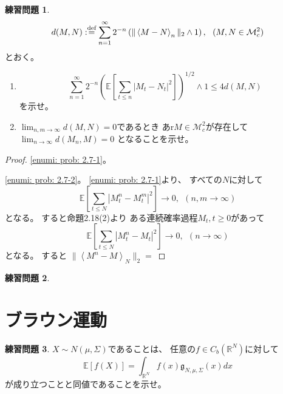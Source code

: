 \documentclass[uplatex]{jsarticle}
\theoremstyle{definition}
\newtheorem{prob}[prob]{練習問題}
\def\R{\mathbb{R}}
\def\E{\mathbb{E}}
\def\mcM{\mathcal{M}}
\def\dfn{:\overset{\mbox{{\scriptsize def}}}{=}}
\begin{document}
\begin{prob}\label{prob: 2.7}
  \[
  d(M,N) \dfn \sum_{n=1}^\infty 2^{-n}
  \left( \| \left< M-N\right>_n \|_2 \wedge 1 \right) ,
  \ \ (M,N\in \mcM_c^2)
  \]
  とおく。
  \begin{enumerate}
    \item \label{enumi: prob: 2.7-1}
    \[
    \sum_{n=1}^\infty 2^{-n}\left(
    \E \left[ \sum_{t\leq n}|M_t-N_t|^2\right]\right)^{1/2}\wedge 1
    \leq 4d(M,N)
    \]
    を示せ。
    \item \label{enumi: prob: 2.7-2}
    \(\lim_{n,m\to \infty}d(M,N)=0\)であるとき
    あr\(M\in \mcM_c^2\)が存在して\(\lim_{n\to \infty}d(M_n,M)=0\)
    となることを示せ。
  \end{enumerate}
\end{prob}

\begin{proof}
  \ref{enumi: prob: 2.7-1}。

  \ref{enumi: prob: 2.7-2}。
  \ref{enumi: prob: 2.7-1}より、
  すべての\(N\)に対して
  \[
  \E \left[ \sum_{t\leq N}|M_t^n-M_t^m|^2\right] \to 0, \ \ (n,m\to \infty)
  \]
  となる。
  すると命題2.18(2)より
  ある連続確率過程\(M_t, t\geq 0\)があって
  \[
  \E \left[ \sum_{t\leq N}|M_t^n-M_t|^2\right] \to 0, \ \ (n\to \infty)
  \]
  となる。
  すると
  \(\| \left< M^n-M\right>_N\|_2 = \)
\end{proof}














\begin{prob}\label{prob: 2.8}

\end{prob}












\newpage
\section{ブラウン運動}
\label{section 3}

\begin{prob}\label{prob: 3.1}
  \(X \sim N(\mu,\Sigma)\)であることは、
  任意の\(f\in C_b(\R^N)\)に対して
  \[
  \E\left[f(X)\right] = \int_{\R^N}f(x)\mathfrak{g}_{N,\mu,\Sigma}(x) dx
  \]
  が成り立つことと同値であることを示せ。
\end{prob}
\end{document}
